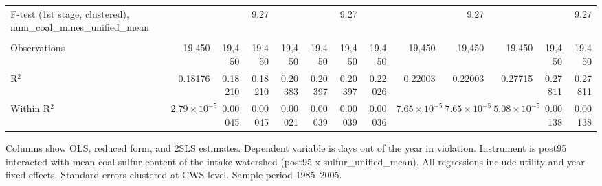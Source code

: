\begin{table}[htbp]
\begin{adjustbox}{width = \textwidth, center}
\begin{tabular}{lrrrrrrrrrrrr}
         F-test (1st stage, clustered), num\_coal\_mines\_unified\_mean     &                       &               & 9.27      &          &               & 9.27      &          &                       & 9.27                  &                       &               & 9.27\\  
         
          \\
         
         Observations                                                       & 19,450                & 19,450        & 19,450    & 19,450   & 19,450        & 19,450    & 19,450   & 19,450                & 19,450                & 19,450                & 19,450        & 19,450\\  
         R$^2$                                                              & 0.18176               & 0.18210       & 0.18210   & 0.20383  & 0.20397       & 0.20397   & 0.22026  & 0.22003               & 0.22003               & 0.27715               & 0.27811       & 0.27811\\  
         Within R$^2$                                                       & $2.79\times 10^{-5}$  & 0.00045       & 0.00045   & 0.00021  & 0.00039       & 0.00039   & 0.00036  & $7.65\times 10^{-5}$  & $7.65\times 10^{-5}$  & $5.08\times 10^{-5}$  & 0.00138       & 0.00138\\  
         
         \bottomrule
         
      \end{tabular}
      
      
      
   \end{adjustbox}
      {\tiny\linespread{1}\selectfont \par \raggedright 
   Columns show OLS, reduced form, and 2SLS estimates. Dependent variable is days out of the year in violation. Instrument is post95 interacted with mean coal sulfur content of the intake watershed (post95 x sulfur\_unified\_mean). All regressions include utility and year fixed effects. Standard errors clustered at CWS level. Sample period 1985--2005.}
   
\end{table}


